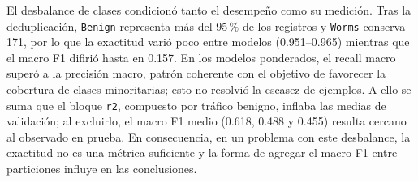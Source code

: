\documentclass[conference]{IEEEtran}
\begin{document}
El desbalance de clases condicionó tanto el desempeño como su medición. Tras la deduplicación, \texttt{Benign} representa más del 95\,\% de los registros y \texttt{Worms} conserva 171, por lo que la exactitud varió poco entre modelos (0.951--0.965) mientras que el macro F1 difirió hasta en 0.157. En los modelos ponderados, el recall macro superó a la precisión macro, patrón coherente con el objetivo de favorecer la cobertura de clases minoritarias; esto no resolvió la escasez de ejemplos. A ello se suma que el bloque \texttt{r2}, compuesto por tráfico benigno, inflaba las medias de validación; al excluirlo, el macro F1 medio (0.618, 0.488 y 0.455) resulta cercano al observado en prueba. En consecuencia, en un problema con este desbalance, la exactitud no es una métrica suficiente y la forma de agregar el macro F1 entre particiones influye en las conclusiones.
\end{document}
